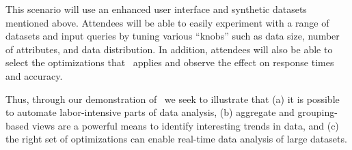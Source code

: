 
 This scenario
will use an enhanced user interface and synthetic datasets mentioned above.
Attendees will be able to easily experiment with a range of datasets and input
queries by tuning various ``knobs'' such as data size, number of attributes, and
data distribution. In addition, attendees will also be able to select the
optimizations that \SeeDB\ applies and observe the effect on response times and
accuracy.

Thus, through our demonstration of \SeeDB\, we seek to illustrate that (a) it is
possible to automate labor-intensive parts of data analysis, (b) aggregate
and grouping-based views are a powerful means to identify interesting trends
in data, and (c) the right set of optimizations can enable real-time data
analysis of large datasets.

